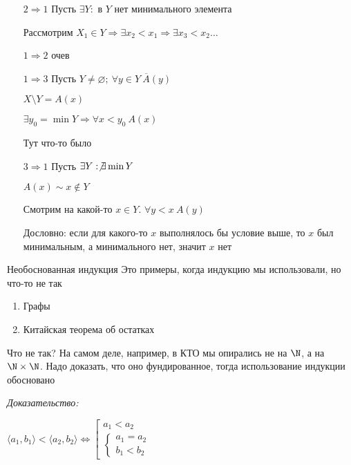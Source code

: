 \documentclass[12pt]{article}
\newcommand{\q}[1]{\langle #1 \rangle}
\begin{document}
\begin{itemize}
    \item[$2 \Rightarrow 1$] Пусть $\exists Y :$ в $Y$ нет минимального элемента
    
    Рассмотрим $X_1 \in Y \Rightarrow \exists x_2 < x_1 \Rightarrow \exists x_3 < x_2 \ldots$

    \item[$1 \Rightarrow 2$] очев 
    
    \item[$1 \Rightarrow 3$] Пусть $Y \neq \varnothing;\ \forall y \in Y\ \overline{A}(y)$
    
    $X \setminus Y = A(x)$

    $\exists y_0 = \min Y \Rightarrow \forall x < y_0\ A(x)$

    Тут что-то было

    \item[$3 \Rightarrow 1$] Пусть $\exists Y : \not\exists \min Y$
    
    $A(x) \sim x \notin Y$

    Смотрим на какой-то $x \in Y$. $\forall y < x\ A(y)$

    Дословно: если для какого-то $x$ выполнялось бы условие выше, то $x$ был минимальным, а минимального нет, значит $x$ нет
\end{itemize}

\begin{nota}{Необоснованная индукция}
    Это примеры, когда индукцию мы использовали, но что-то не так

    \begin{enumerate}
        \item Графы
        \item Китайская теорема об остатках
    \end{enumerate}

    Что не так? На самом деле, например, в КТО мы опирались не на $\N$, а на $\N \times \N$. Надо доказать, что оно фундированное, тогда использование индукции обосновано
\end{nota}

\textit{Доказательство:}

$\q{a_1, b_1} < \q{a_2, b_2} \Leftrightarrow \left[ \begin{gathered}
    a_1 < a_2 \\
    \begin{cases}
        a_1 = a_2 \\
        b_1 < b_2
    \end{cases}
\end{gathered} \right.$
\end{document}
